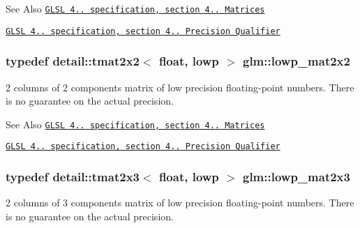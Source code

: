 \begin{DoxySeeAlso}{See Also}
\href{http://www.opengl.org/registry/doc/GLSLangSpec.4.20.8.pdf}{\tt G\-L\-S\-L 4.. specification, section 4.. Matrices} 

\href{http://www.opengl.org/registry/doc/GLSLangSpec.4.20.8.pdf}{\tt G\-L\-S\-L 4.. specification, section 4.. Precision Qualifier} 
\end{DoxySeeAlso}
\hypertarget{group__core__precision_ga7d7e123d953978cc17de6882bb10400e}{
\subsubsection[{lowp\-\_\-mat2x2}]{\setlength{\rightskip}{0pt plus 5cm}typedef detail\-::tmat2x2$<$ float, lowp $>$ {\bf glm\-::lowp\-\_\-mat2x2}}}\label{group__core__precision_ga7d7e123d953978cc17de6882bb10400e}
2 columns of 2 components matrix of low precision floating-\/point numbers. There is no guarantee on the actual precision.

\begin{DoxySeeAlso}{See Also}
\href{http://www.opengl.org/registry/doc/GLSLangSpec.4.20.8.pdf}{\tt G\-L\-S\-L 4.. specification, section 4.. Matrices} 

\href{http://www.opengl.org/registry/doc/GLSLangSpec.4.20.8.pdf}{\tt G\-L\-S\-L 4.. specification, section 4.. Precision Qualifier} 
\end{DoxySeeAlso}
\hypertarget{group__core__precision_gaef481e637af5103a83ab561d30d28f2a}{
\subsubsection[{lowp\-\_\-mat2x3}]{\setlength{\rightskip}{0pt plus 5cm}typedef detail\-::tmat2x3$<$ float, lowp $>$ {\bf glm\-::lowp\-\_\-mat2x3}}}\label{group__core__precision_gaef481e637af5103a83ab561d30d28f2a}
2 columns of 3 components matrix of low precision floating-\/point numbers. There is no guarantee on the actual precision.

